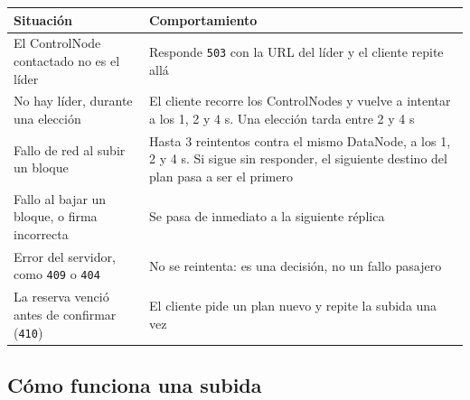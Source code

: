 \documentclass[10pt]{article}
\begin{document}
\begin{xltabular}{\linewidth}{@{}L{5.6cm}Y@{}}
\toprule
Situación & Comportamiento \\
\midrule\endhead
El ControlNode contactado no es el líder & Responde \texttt{503} con la URL del líder y el cliente repite allá \\
No hay líder, durante una elección & El cliente recorre los ControlNodes y vuelve a intentar a los 1, 2 y 4 s. Una elección tarda entre 2 y 4 s \\
Fallo de red al subir un bloque & Hasta 3 reintentos contra el mismo DataNode, a los 1, 2 y 4 s. Si sigue sin responder, el siguiente destino del plan pasa a ser el primero  \\
Fallo al bajar un bloque, o firma incorrecta & Se pasa de inmediato a la siguiente réplica \\
Error del servidor, como \texttt{409} o \texttt{404} & No se reintenta: es una decisión, no un fallo pasajero \\
La reserva venció antes de confirmar (\texttt{410}) & El cliente pide un plan nuevo y repite la subida una vez \\
\bottomrule
\end{xltabular}

\subsection{Cómo funciona una subida}

\begin{center}
\end{center}
\end{document}
